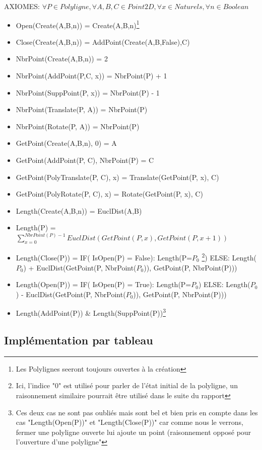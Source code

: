 \documentclass[a4paper, 11pt, oneside]{article}
\begin{document}
\noindent AXIOMES: $\forall P \in Polyligne, \forall A, B, C \in Point2D, \forall x \in Naturels, \forall n \in Boolean$
\begin{itemize}
    \item Open(Create(A,B,n)) = Create(A,B,n)\footnote{Les Polylignes seeront toujours ouvertes à la création}
    \item Close(Create(A,B,n)) = AddPoint(Create(A,B,False),C)
    \item NbrPoint(Create(A,B,n)) = 2
    \item NbrPoint(AddPoint(P,C, x)) = NbrPoint(P) + 1
    \item NbrPoint(SuppPoint(P, x)) = NbrPoint(P) - 1
    \item NbrPoint(Translate(P, A)) = NbrPoint(P)
    \item NbrPoint(Rotate(P, A)) = NbrPoint(P)
    \item GetPoint(Create(A,B,n), 0) = A
    \item GetPoint(AddPoint(P, C), NbrPoint(P) = C
    \item GetPoint(PolyTranslate(P, C), x) =  Translate(GetPoint(P, x), C)
    \item GetPoint(PolyRotate(P, C), x) =  Rotate(GetPoint(P, x), C)
    \item Length(Create(A,B,n)) = EuclDist(A,B)
    \item Length(P) = $\sum_{x=0}^{NbrPoint(P)-1} EuclDist(GetPoint(P,x),GetPoint(P,x+1))$
    \item Length(Close(P)) = IF( IsOpen(P) = False): Length(P=$P_0$ \footnote{Ici, l'indice "0" est utilisé pour parler de l'état initial de la polyligne, un raisonnement similaire pourrait être utilisé dans le suite du rapport})
    ELSE: Length($P_0$) + EuclDist(GetPoint(P, NbrPoint($P_0$)), GetPoint(P, NbrPoint(P)))
    \item Length(Open(P)) = IF( IsOpen(P) = True): Length(P=$P_0$)
    ELSE: Length($P_0$) - EuclDist(GetPoint(P, NbrPoint($P_0$)), GetPoint(P, NbrPoint(P)))
    \item Length(AddPoint(P)) \& Length(SuppPoint(P))\footnote{Ces deux cas ne sont pas oubliés mais sont bel et bien pris en compte dans les cas "Length(Open(P))" et "Length(Close(P))" car comme nous le verrons, fermer une polyligne ouverte lui ajoute un point (raisonnement opposé pour l'ouverture d'une polyligne" }
    
\end{itemize}



\subsection{Implémentation par tableau}
\end{document}

